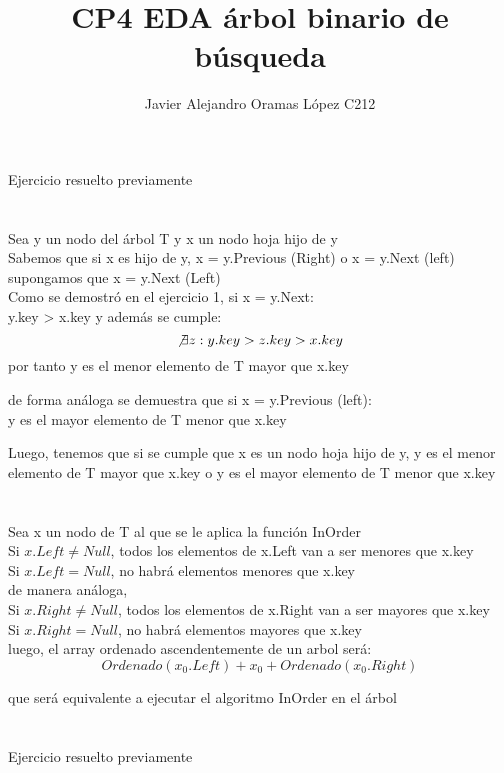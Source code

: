 \documentclass{article}
\title{CP4 EDA árbol binario de búsqueda}
\author{Javier Alejandro Oramas López C212}
\date{}
\begin{document}
    \maketitle
    \section{}
    Ejercicio resuelto previamente
    \section{}
    Sea y un nodo del árbol T y x un nodo hoja hijo de y\\
    Sabemos que si x es hijo de y, x = y.Previous (Right) o x = y.Next (left)\\
    supongamos que x = y.Next (Left)\\
    Como se demostró en el ejercicio 1, si x = y.Next:\\
    y.key > x.key y además se cumple:\\
    \[\not \exists z : y.key > z.key > x.key \]
    por tanto y es el menor elemento de T mayor que x.key
    
    de forma análoga se demuestra que si x = y.Previous (left):\\
    y es el mayor elemento de T menor que x.key
    
    Luego, tenemos que si se cumple que x es un nodo hoja hijo de y, y es el menor elemento de T mayor que x.key o y es el mayor elemento de T menor que x.key
    
    \section{}
    Sea x un nodo de T al que se le aplica la función InOrder\\
    Si $x.Left \not = Null$, todos los elementos de x.Left van a ser menores que x.key\\
    Si $x.Left = Null$, no habrá elementos menores que x.key\\
    de manera análoga, \\
    Si $x.Right \not = Null$, todos los elementos de x.Right van a ser mayores que x.key\\
    Si $x.Right = Null$, no habrá elementos mayores que x.key\\

    luego, el array ordenado ascendentemente de un arbol será:\\

    \[Ordenado(x_0.Left) + x_0 + Ordenado(x_0.Right)\]
    
    que será equivalente a ejecutar el algoritmo InOrder en el árbol

    \section{}
    Ejercicio resuelto previamente
\end{document}
